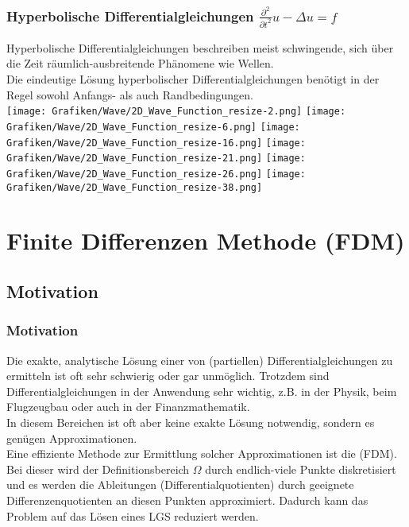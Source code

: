 \begin{frame}\frametitle{Hyperbolische Differentialgleichungen $\frac{\partial^2}{\partial t^2}u-\Delta u = f$}
Hyperbolische Differentialgleichungen beschreiben meist schwingende, sich über die Zeit räumlich-ausbreitende Phänomene wie Wellen.\\
Die eindeutige Lösung hyperbolischer Differentialgleichungen benötigt in der Regel sowohl Anfangs- als auch Randbedingungen.\\
\texttt{[image: Grafiken/Wave/2D\_Wave\_Function\_resize-2.png]}
\texttt{[image: Grafiken/Wave/2D\_Wave\_Function\_resize-6.png]}
\texttt{[image: Grafiken/Wave/2D\_Wave\_Function\_resize-16.png]}
\texttt{[image: Grafiken/Wave/2D\_Wave\_Function\_resize-21.png]}
\texttt{[image: Grafiken/Wave/2D\_Wave\_Function\_resize-26.png]}
\texttt{[image: Grafiken/Wave/2D\_Wave\_Function\_resize-38.png]}
\end{frame}
%
\section{Finite Differenzen Methode (FDM)}
\makeSectionDividerPage
%
\subsection{Motivation}
%
\begin{frame}\frametitle{Motivation}
Die exakte, analytische Lösung einer von (partiellen) Differentialgleichungen zu ermitteln ist oft sehr schwierig oder gar unmöglich. Trotzdem sind Differentialgleichungen in der Anwendung sehr wichtig, z.B. in der Physik, beim Flugzeugbau oder auch in der Finanzmathematik.\\\vfill 
In diesem Bereichen ist oft aber keine exakte Lösung notwendig, sondern es genügen Approximationen.\\\vfill 
Eine effiziente Methode zur Ermittlung solcher Approximationen ist die  (FDM). Bei dieser wird der Definitionsbereich $\Omega$ durch endlich-viele Punkte diskretisiert und es werden die Ableitungen (Differentialquotienten) durch geeignete Differenzenquotienten an diesen Punkten approximiert. Dadurch kann das Problem auf das Lösen eines LGS reduziert werden.
\end{frame}
%
%
